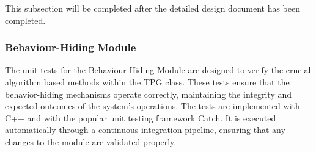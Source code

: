 \documentclass[12pt, titlepage]{article}
\begin{document}
This subsection will be completed after the detailed design document has been completed.



\subsubsection{Behaviour-Hiding Module}

The unit tests for the Behaviour-Hiding Module are designed to verify the crucial algorithm based methods within the TPG class. These tests ensure that the behavior-hiding mechanisms operate correctly, maintaining the integrity and expected outcomes of the system's operations. The tests are implemented with C++ and with the popular unit testing framework Catch. It is executed automatically through a continuous integration pipeline, ensuring that any changes to the module are validated properly.







					
					
					


					

					
\end{document}
